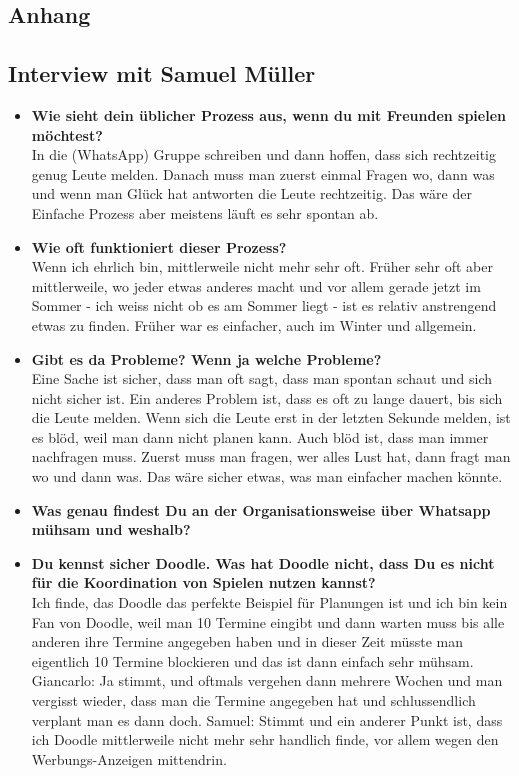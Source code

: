 \newpage
\begin{appendix}
\chapter{Anhang}
\section{Interview mit Samuel Müller}
\begin{itemize}
    \item \textbf{Wie sieht dein üblicher Prozess aus, wenn du mit Freunden spielen möchtest?}\\
    In die (WhatsApp) Gruppe schreiben und dann hoffen, dass sich rechtzeitig genug Leute melden. Danach muss man zuerst einmal Fragen wo, dann was und wenn man Glück hat antworten die Leute rechtzeitig. Das wäre der Einfache Prozess aber meistens läuft es sehr spontan ab.
    \item \textbf{Wie oft funktioniert dieser Prozess?}\\
    Wenn ich ehrlich bin, mittlerweile nicht mehr sehr oft. Früher sehr oft aber mittlerweile, wo jeder etwas anderes macht und vor allem gerade jetzt im Sommer - ich weiss nicht ob es am Sommer liegt - ist es relativ anstrengend etwas zu finden. Früher war es einfacher, auch im Winter und allgemein.
    \item \textbf{Gibt es da Probleme? Wenn ja welche Probleme?}\\
    Eine Sache ist sicher, dass man oft sagt, dass man spontan schaut und sich nicht sicher ist. Ein anderes Problem ist, dass es oft zu lange dauert, bis sich die Leute melden. Wenn sich die Leute erst in der letzten Sekunde melden, ist es blöd, weil man dann nicht planen kann. Auch blöd ist, dass man immer nachfragen muss. Zuerst muss man fragen, wer alles Lust hat, dann fragt man wo und dann was. Das wäre sicher etwas, was man einfacher machen könnte.
    \item \textbf{Was genau findest Du an der Organisationsweise über Whatsapp mühsam und weshalb?}\\
    \item \textbf{Du kennst sicher Doodle. Was hat Doodle nicht, dass Du es nicht für die Koordination von Spielen nutzen kannst?}\\
    Ich finde, das Doodle das perfekte Beispiel für Planungen ist und ich bin kein Fan von Doodle, weil man 10 Termine eingibt und dann warten muss bis alle anderen ihre Termine angegeben haben und in dieser Zeit müsste man eigentlich 10 Termine blockieren und das ist dann einfach sehr mühsam.
    \newline
    Giancarlo: Ja stimmt, und oftmals vergehen dann mehrere Wochen und man vergisst wieder, dass man die Termine angegeben hat und schlussendlich verplant man es dann doch.
    \newline
    Samuel: Stimmt und ein anderer Punkt ist, dass ich Doodle mittlerweile nicht mehr sehr handlich finde, vor allem wegen den Werbungs-Anzeigen mittendrin.


\end{itemize}
\end{appendix}
